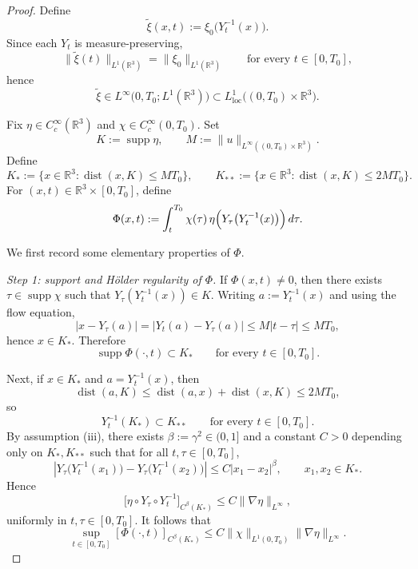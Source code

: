\documentclass[reqno,11pt]{amsart}
\begin{document}
\begin{proof}
Define
\[
\widetilde{\xi}(x,t):=\xi_0\bigl(Y_t^{-1}(x)\bigr).
\]
Since each $Y_t$ is measure-preserving,
\[
\|\widetilde{\xi}(t)\|_{L^1(\mathbb R^3)}=\|\xi_0\|_{L^1(\mathbb R^3)}
\qquad\text{for every }t\in[0,T_0],
\]
hence
\[
\widetilde{\xi}\in L^\infty\bigl(0,T_0;L^1(\mathbb R^3)\bigr)
\subset L^1_{\mathrm{loc}}\bigl((0,T_0)\times\mathbb R^3\bigr).
\]

Fix $\eta\in C_c^\infty(\mathbb R^3)$ and $\chi\in C_c^\infty(0,T_0)$. Set
\[
K:=\operatorname{supp}\eta,
\qquad
M:=\|u\|_{L^\infty((0,T_0)\times\mathbb R^3)}.
\]
Define
\[
K_*:=\{x\in\mathbb R^3:\operatorname{dist}(x,K)\le MT_0\},
\qquad
K_{**}:=\{x\in\mathbb R^3:\operatorname{dist}(x,K)\le 2MT_0\}.
\]
For $(x,t)\in\mathbb R^3\times[0,T_0]$, define
\[
\Phi(x,t):=
\int_t^{T_0}\chi(\tau)\,\eta\Bigl(Y_\tau \big(Y_t^{-1}(x)\big)\Bigr)\,d\tau.
\]

We first record some elementary properties of $\Phi$.

\smallskip
\noindent\emph{Step 1: support and H\"older regularity of $\Phi$.}
If $\Phi(x,t)\neq 0$, then there exists $\tau\in \operatorname{supp}\chi$ such that
$Y_\tau(Y_t^{-1}(x))\in K$. Writing $a:=Y_t^{-1}(x)$ and using the flow equation,
\[
|x-Y_\tau(a)|=|Y_t(a)-Y_\tau(a)|
\le M|t-\tau|
\le MT_0,
\]
hence $x\in K_*$. Therefore
\[
\operatorname{supp}\Phi(\cdot,t)\subset K_*
\qquad\text{for every }t\in[0,T_0].
\]

Next, if $x\in K_*$ and $a=Y_t^{-1}(x)$, then
\[
\operatorname{dist}(a,K)\le \operatorname{dist}(a,x)+\operatorname{dist}(x,K)\le 2MT_0,
\]
so
\[
Y_t^{-1}(K_*)\subset K_{**}
\qquad\text{for every }t\in[0,T_0].
\]
By assumption (iii), there exists $\beta:=\gamma^2\in(0,1]$ and a constant $C>0$
depending only on $K_*,K_{**}$ such that for all $t,\tau\in[0,T_0]$,
\[
\left|Y_\tau\big(Y_t^{-1}(x_1)\big)-Y_\tau\big(Y_t^{-1}(x_2)\big)
\right|
\le C |x_1-x_2|^\beta,
\qquad x_1,x_2\in K_*.
\]
Hence
\[
\bigl[\eta\circ Y_\tau\circ Y_t^{-1}\bigr]_{C^\beta(K_*)}
\le C\|\nabla\eta\|_{L^\infty},
\]
uniformly in $t,\tau\in[0,T_0]$. It follows that
\begin{equation}
\label{eq:Phi_holder_appendix}
\sup_{t\in[0,T_0]}[\Phi(\cdot,t)]_{C^\beta(K_*)}
\le C\|\chi\|_{L^1(0,T_0)}\|\nabla\eta\|_{L^\infty}.
\end{equation}




\end{proof}
\end{document}
